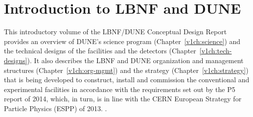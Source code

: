 

\chapter{Introduction to LBNF and DUNE}
\label{ch:project-overview}




This introductory volume of the LBNF/DUNE Conceptual Design Report provides an overview of DUNE's science program (Chapter~\ref{v1ch:science}) and the technical designs of the facilities and the detectors 
(Chapter~\ref{v1ch:tech-designs}). It also describes the LBNF and DUNE organization and management structures 
(Chapter~\ref{v1ch:org-mgmt}) and the strategy (Chapter~\ref{v1ch:strategy})  that is being developed to construct, install and commission the conventional and experimental facilities in accordance with the requirements set out by the P5 report of 2014, which, in turn, is in line with the CERN
European Strategy for Particle Physics (ESPP) of 2013. .